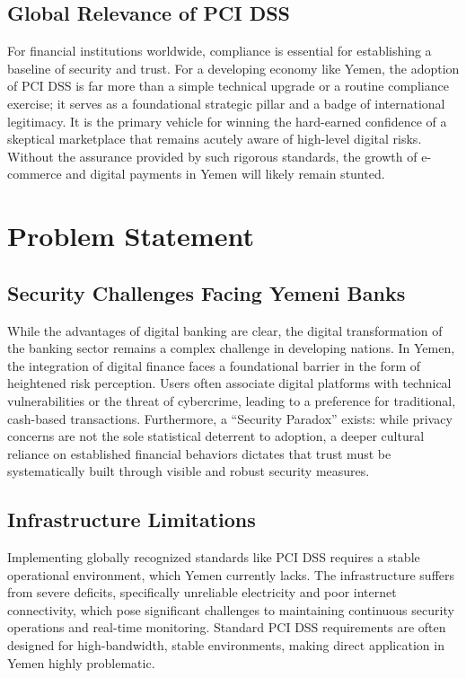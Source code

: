 \documentclass[12pt,a4paper,oneside]{report}
\begin{document}
	\subsection{Global Relevance of PCI DSS}
	For financial institutions worldwide, compliance is essential for establishing a baseline of security and trust. For a developing economy like Yemen, the adoption of PCI DSS is far more than a simple technical upgrade or a routine compliance exercise; it serves as a foundational strategic pillar and a badge of international legitimacy. It is the primary vehicle for winning the hard-earned confidence of a skeptical marketplace that remains acutely aware of high-level digital risks. Without the assurance provided by such rigorous standards, the growth of e-commerce and digital payments in Yemen will likely remain stunted.
	
	\section{Problem Statement}
	
	\subsection{Security Challenges Facing Yemeni Banks}
	While the advantages of digital banking are clear, the digital transformation of the banking sector remains a complex challenge in developing nations. In Yemen, the integration of digital finance faces a foundational barrier in the form of heightened risk perception. Users often associate digital platforms with technical vulnerabilities or the threat of cybercrime, leading to a preference for traditional, cash-based transactions. Furthermore, a ``Security Paradox'' exists: while privacy concerns are not the sole statistical deterrent to adoption, a deeper cultural reliance on established financial behaviors dictates that trust must be systematically built through visible and robust security measures.
	
	\subsection{Infrastructure Limitations}
	Implementing globally recognized standards like PCI DSS requires a stable operational environment, which Yemen currently lacks. The infrastructure suffers from severe deficits, specifically unreliable electricity and poor internet connectivity, which pose significant challenges to maintaining continuous security operations and real-time monitoring. Standard PCI DSS requirements are often designed for high-bandwidth, stable environments, making direct application in Yemen highly problematic.
	
\end{document}
